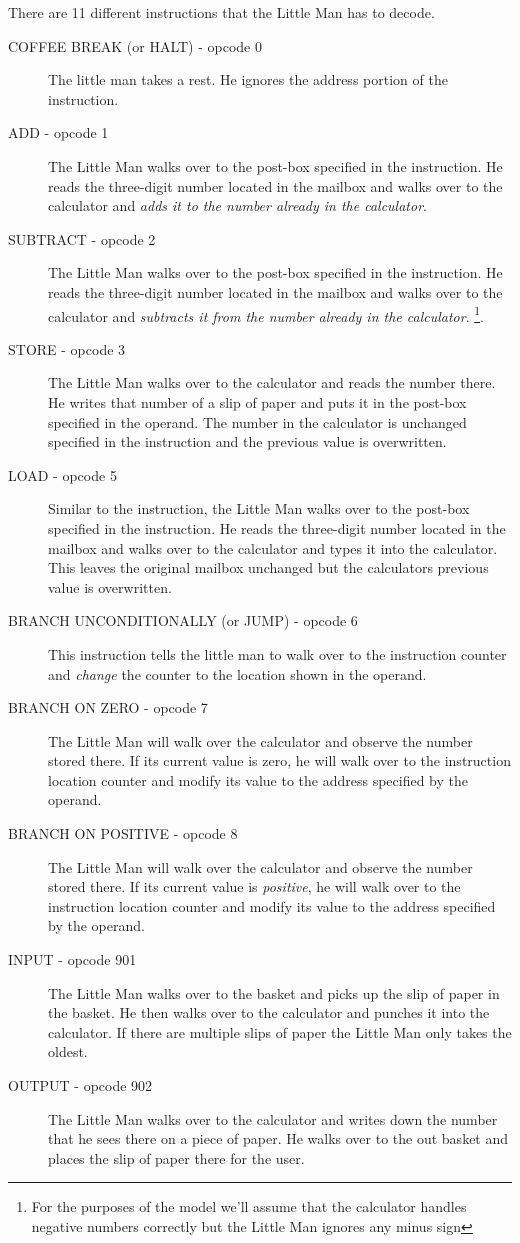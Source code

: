 				There are 11 different instructions that the Little Man has to decode. 
				\begin{description}
					\item[COFFEE BREAK (or HALT) - opcode 0] The little man takes a rest. He ignores the address portion of the instruction.
					\item[ADD - opcode 1] The Little Man walks over to the post-box specified in the instruction. He reads the three-digit number located in the mailbox and walks over to the calculator and \textit{adds it to the number already in the calculator}.
					\item[SUBTRACT - opcode 2] The Little Man walks over to the post-box specified in the instruction. He reads the three-digit number located in the mailbox and walks over to the calculator and \textit{subtracts it from the number already in the calculator}. \footnote{For the purposes of the model we'll assume that the calculator handles negative numbers correctly but the Little Man ignores any minus sign}.
					\item[STORE - opcode 3] The Little Man walks over to the calculator and reads the number there. He writes that number of a slip of paper and puts it in the post-box specified in the operand. The number in the calculator is unchanged specified in the instruction and the previous value is overwritten.
					\item[LOAD - opcode 5] Similar to the  instruction, the Little Man walks over to the post-box specified in the instruction. He reads the three-digit number located in the mailbox and walks over to the calculator and types it into the calculator. This leaves the original mailbox unchanged but the calculators previous value is overwritten.
					\item[BRANCH UNCONDITIONALLY (or JUMP) - opcode 6] This instruction tells the little man to walk over to the instruction counter and \textit{change} the counter to the location shown in the operand. 
					\item[BRANCH ON ZERO - opcode 7] The Little Man will walk over the calculator and observe the number stored there. If its current value is zero, he will walk over to the instruction location counter and modify its value to the address specified by the operand.
					\item[BRANCH ON POSITIVE - opcode 8] The Little Man will walk over the calculator and observe the number stored there. If its current value is \textit{positive}, he will walk over to the instruction location counter and modify its value to the address specified by the operand.
					\item[INPUT - opcode 901] The Little Man walks over to the basket and picks up the slip of paper in the basket. He then walks over to the calculator and punches it into the calculator. If there are multiple slips of paper the Little Man only takes the oldest.
					\item[OUTPUT - opcode 902] The Little Man walks over to the calculator and writes down the number that he sees there on a piece of paper. He walks over to the out basket and places the slip of paper there for the user.
					
					
				\end{description}
				
